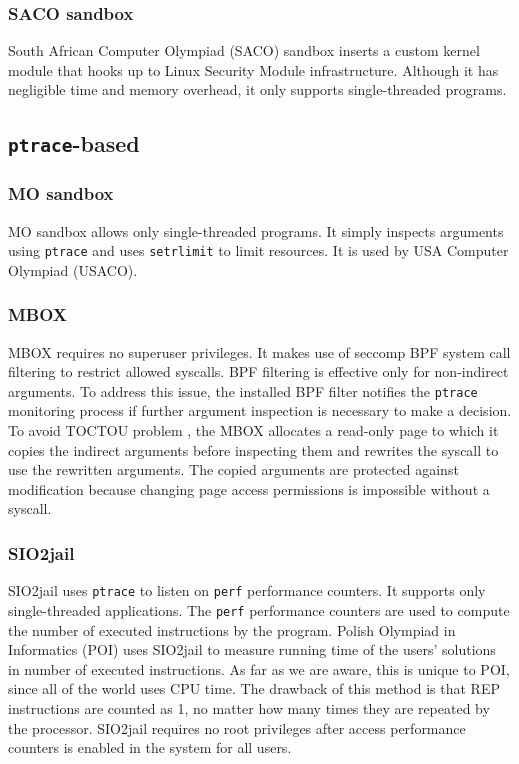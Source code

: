 \documentclass[en]{pracamgr}
\begin{document}
\subsubsection{SACO sandbox}

South African Computer Olympiad (SACO) sandbox \cite{merry2009using} inserts a custom kernel module that hooks up to Linux Security Module infrastructure. Although it has negligible time and memory overhead, it only supports single-threaded programs.

\subsection{\texttt{ptrace}-based}

\subsubsection{MO sandbox}
MO sandbox \cite{marevs2007perspectives, kolstad2009infrastructure} allows only single-threaded programs. It simply inspects arguments using \texttt{ptrace} and uses \texttt{setrlimit} \cite{man_getrlimit_setrlimit_prlimit} to limit resources. It is used by USA Computer Olympiad (USACO).

\subsubsection{MBOX}
MBOX \cite{kim2013practical} requires no superuser privileges. It makes use of seccomp BPF system call filtering to restrict allowed syscalls. BPF filtering is effective only for non-indirect arguments. To address this issue, the installed BPF filter notifies the \texttt{ptrace} monitoring process if further argument inspection is necessary to make a decision. To avoid TOCTOU problem \cite{cwe_toctou}, the MBOX allocates a read-only page to which it copies the indirect arguments before inspecting them and rewrites the syscall to use the rewritten arguments. The copied arguments are protected against modification because changing page access permissions is impossible without a syscall.

\subsubsection{SIO2jail}
SIO2jail \cite{sio2jail} uses \texttt{ptrace} to listen on \texttt{perf} \cite{perf} performance counters. It supports only single-threaded applications. The \texttt{perf} performance counters are used to compute the number of executed instructions by the program. Polish Olympiad in Informatics (POI) uses SIO2jail to measure running time of the users' solutions in number of executed instructions. As far as we are aware, this is unique to POI, since all of the world uses CPU time. The drawback of this method is that REP instructions are counted as 1, no matter how many times they are repeated by the processor. SIO2jail requires no root privileges after access performance counters is enabled in the system for all users.
\end{document}
